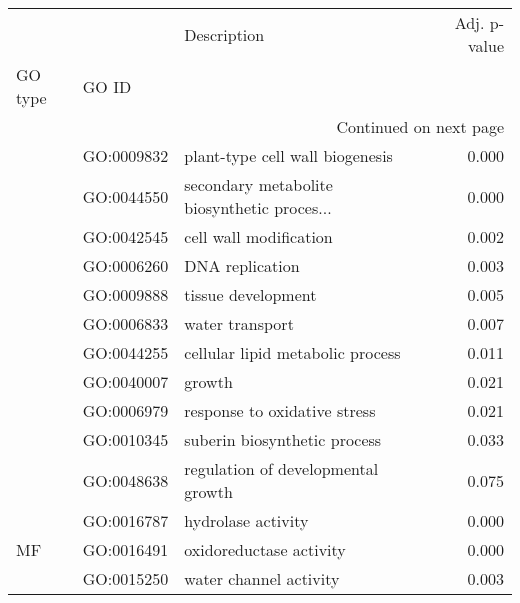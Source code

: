 \begin{longtable}{lllr}
\toprule
   &            &                                  Description &  Adj. p-value \\
GO type & GO ID &                                              &               \\
\midrule
\endhead
\midrule
\multicolumn{4}{r}{{Continued on next page}} \\
\midrule
\endfoot

\bottomrule
\endlastfoot
\multirow{11}{*}{BP} & GO:0009832 &              plant-type cell wall biogenesis &         0.000 \\
   & GO:0044550 &  secondary metabolite biosynthetic proces... &         0.000 \\
   & GO:0042545 &                       cell wall modification &         0.002 \\
   & GO:0006260 &                              DNA replication &         0.003 \\
   & GO:0009888 &                           tissue development &         0.005 \\
   & GO:0006833 &                              water transport &         0.007 \\
   & GO:0044255 &             cellular lipid metabolic process &         0.011 \\
   & GO:0040007 &                                       growth &         0.021 \\
   & GO:0006979 &                 response to oxidative stress &         0.021 \\
   & GO:0010345 &                 suberin biosynthetic process &         0.033 \\
   & GO:0048638 &           regulation of developmental growth &         0.075 \\
\cline{1-4}
\multirow{3}{*}{MF} & GO:0016787 &                           hydrolase activity &         0.000 \\
   & GO:0016491 &                      oxidoreductase activity &         0.000 \\
   & GO:0015250 &                       water channel activity &         0.003 \\
\end{longtable}
